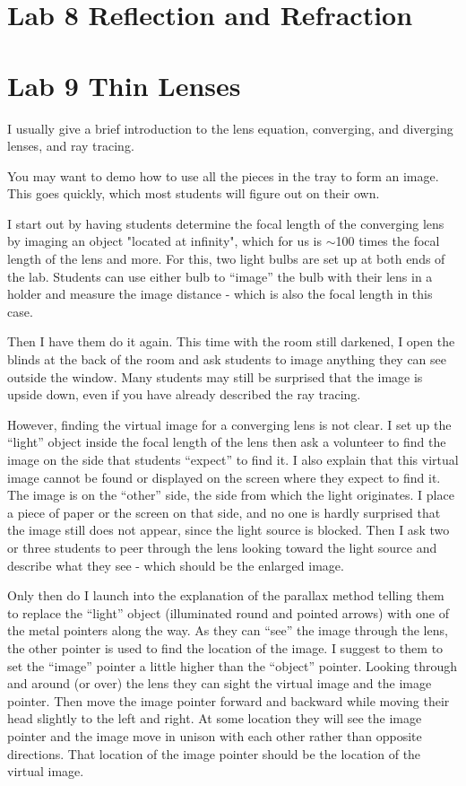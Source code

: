 \section{Lab 8 Reflection and Refraction}

\section{Lab 9 Thin Lenses}
I usually give a brief introduction to the lens equation, converging, and diverging lenses, and ray tracing.

You may want to demo how to use all the pieces in the tray to form an image. This goes quickly, which most students will figure out on their own.

I start out by having students determine the focal length of the converging lens by imaging an object "located at infinity", which for us is $\sim$100 times the focal length of the lens and more. For this, two light bulbs are set up at both ends of the lab. Students can use either bulb to ``image'' the bulb with their lens in a holder and measure the image distance - which is also the focal length in this case. 

Then I have them do it again. This time with the room still darkened, I open the blinds at the back of the room and ask students to image anything they can see outside the window. Many students may still be surprised that the image is upside down, even if you have already described the ray tracing.

However, finding the virtual image for a converging lens is not clear. I set up the ``light'' object inside the focal length of the lens then ask a volunteer to find the image on the side that students ``expect'' to find it. I also explain that this virtual image cannot be found or displayed on the screen where they expect to find  it. The image is on the ``other'' side, the side from which the light originates. I place a piece of paper or the screen on that side, and no one is hardly surprised that the image still does not appear, since the light source is blocked. Then I ask two or three students to peer through the lens looking toward the light source and describe what they see - which should be the enlarged image.

Only then do I launch into the explanation of the parallax method telling them to replace the ``light'' object (illuminated round and pointed arrows) with one of the metal pointers along the way. As they can ``see'' the image through the lens, the other pointer is used to find the location of the image. I suggest to them to set the ``image'' pointer a little higher than the ``object'' pointer. Looking through and around (or over) the lens they can sight the virtual image and the image pointer. Then move the image pointer forward and backward while moving their head slightly to the left and right. At some location they will see the image pointer and the image move in unison with each other rather than opposite directions. That location of the image pointer should be the location of the virtual image.

